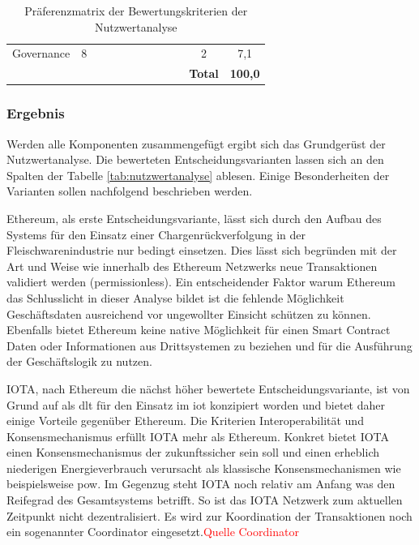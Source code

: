 \begin{table}[H]
{\begin{tabular}{@{}lccccccccccc@{}}
		Governance               & 8            & {\cellcolor{gray!25} } & {\cellcolor{gray!25} }  & {\cellcolor{gray!25} } & {\cellcolor{gray!25} } & {\cellcolor{gray!25} } & {\cellcolor{gray!25} } & {\cellcolor{gray!25} } & {\cellcolor{gray!25} } & 2               & 7,1                 \\ \addlinespace
		\midrule
		&              &                         &                          &                         &                         &                         &                         &                         &                         & \textbf{Total}  & \textbf{100,0}      \\
		\bottomrule
	\end{tabular}%
	}
	\caption{Präferenzmatrix der Bewertungskriterien der Nutzwertanalyse}
	\label{tab:preferencematrix}
\end{table}

\subsubsection{Ergebnis}
Werden alle Komponenten zusammengefügt ergibt sich das Grundgerüst der Nutzwertanalyse. Die bewerteten Entscheidungsvarianten lassen sich an den Spalten der Tabelle \ref{tab:nutzwertanalyse} ablesen. Einige Besonderheiten der Varianten sollen nachfolgend beschrieben werden.

Ethereum, als erste Entscheidungsvariante, lässt sich durch den Aufbau des Systems für den Einsatz einer Chargenrückverfolgung in der Fleischwarenindustrie nur bedingt einsetzen. Dies lässt sich begründen mit der Art und Weise wie innerhalb des Ethereum Netzwerks neue Transaktionen validiert werden (permissionless). Ein entscheidender Faktor warum Ethereum das Schlusslicht in dieser Analyse bildet ist die fehlende Möglichkeit Geschäftsdaten ausreichend vor ungewollter Einsicht schützen zu können. Ebenfalls bietet Ethereum keine native Möglichkeit für einen Smart Contract Daten oder Informationen aus Drittsystemen zu beziehen und für die Ausführung der Geschäftslogik zu nutzen.

IOTA, nach Ethereum die nächst höher bewertete Entscheidungsvariante, ist von Grund auf als \ac{dlt} für den Einsatz im \acf{iot} konzipiert worden und bietet daher einige Vorteile gegenüber Ethereum. Die Kriterien Interoperabilität und Konsensmechanismus erfüllt IOTA mehr als Ethereum. Konkret bietet IOTA einen Konsensmechanismus der zukunftssicher sein soll und einen erheblich niederigen Energieverbrauch verursacht als klassische Konsensmechanismen wie beispielsweise \ac{pow}. Im Gegenzug steht IOTA noch relativ am Anfang was den Reifegrad des Gesamtsystems betrifft. So ist das IOTA Netzwerk zum aktuellen Zeitpunkt nicht dezentralisiert. Es wird zur Koordination der Transaktionen noch ein sogenannter \glqq Coordinator \grqq{} eingesetzt.\textcolor{red}{Quelle Coordinator}

